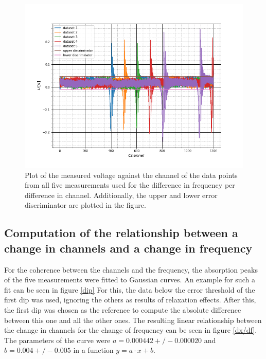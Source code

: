 \begin{figure}[h]
	\includegraphics[scale=0.5]{Bild/all_dx_discr}
	\centering
	\caption[Plot of all data used for discriminator determination and the discriminators]{Plot of the measured voltage against the channel of the data points from all five measurements used for the difference in frequency per difference in channel. Additionally, the upper and lower error discriminator are plotted in the figure.}
	\label{err_threshs}
\end{figure}


\FloatBarrier
\subsection{Computation of the relationship between a change in channels and a change in frequency}
For the coherence between the channels and the frequency, the absorption peaks of the five measurements were fitted to Gaussian curves. An example for such a fit can be seen in figure \ref{dip} For this, the data below the error threshold of the first dip was used, ignoring the others as results of relaxation effects. After this, the first dip was chosen as the reference to compute the absolute difference between this one and all the other ones. 
The resulting linear relationship between the change in channels for the change of frequency can be seen in figure \ref{dx/df}. The parameters of the curve were  $a = 0.000442+/-0.000020$ and $b=0.004+/-0.005$ in a function $y = a\cdot x+b$.

